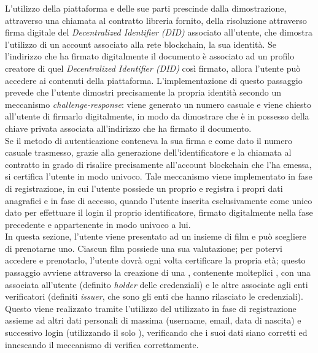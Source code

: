 L'utilizzo della piattaforma e delle sue parti prescinde dalla dimostrazione, attraverso una chiamata al contratto libreria fornito, della risoluzione attraverso firma digitale
del \textit{Decentralized Identifier (DID)} associato all'utente, che dimostra l'utilizzo di un account associato alla rete blockchain,
la sua identità. Se l'indirizzo che ha firmato digitalmente il documento è associato ad un profilo creatore di quel \textit{Decentralized Identifier (DID)} così firmato,
allora l'utente può accedere ai contenuti della piattaforma. L'implementazione di questo passaggio prevede che l'utente dimostri precisamente
la propria identità secondo un meccanismo \textit{challenge-response}: viene generato un numero casuale e viene chiesto all'utente di firmarlo digitalmente, in modo da dimostrare
che è in possesso della chiave privata associata all'indirizzo che ha firmato il documento. \\

Se il metodo di autenticazione conteneva la sua firma e come dato il numero casuale trasmesso, grazie alla generazione dell'identificatore
e la chiamata al contratto in grado di risalire precisamente all'account blockchain che l'ha emessa, si certifica l'utente in modo univoco.
Tale meccanismo viene implementato in fase di registrazione, in cui l'utente possiede un proprio  e registra i propri dati anagrafici
e in fase di accesso, quando l'utente inserita esclusivamente come unico dato per effettuare il login il proprio identificatore, firmato digitalmente nella fase precedente e appartenente in modo univoco a lui. \\

In questa sezione, l'utente viene presentato ad un insieme di film e può scegliere di prenotarne uno. Ciascun film possiede una sua valutazione;
per potervi accedere e prenotarlo, l'utente dovrà ogni volta certificare la propria età;
questo passaggio avviene attraverso la creazione di una , contenente molteplici , 
con una associata all'utente (definito \textit{holder} delle credenziali) e le altre associate agli enti verificatori (definiti \textit{issuer}, che sono gli enti che hanno rilasciato le credenziali).
Questo viene realizzato tramite l'utilizzo del  utilizzato in fase di registrazione assieme ad altri dati personali 
di massima (username, email, data di nascita) e successivo login (utilizzando il solo ), verificando che 
i suoi dati siano corretti ed innescando il meccanismo di verifica correttamente. \\

